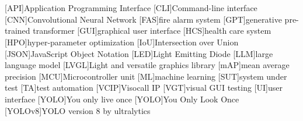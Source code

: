 \documentclass[Bachelor, BIC, english, fhCitStyle, IEEE]{BASE/twbook} %
\begin{document}
\printbibliography
\clearpage

\listoffigures %
\clearpage

\listoftables %
\clearpage

\listoflistings %
\clearpage

{}
\chapter*{\listacroname}
\begin{acronym}
    [API]{Application Programming Interface}
    [CLI]{Command-line interface}
    [CNN]{Convolutional Neural Network}
    [FAS]{fire alarm system}
    [GPT]{generative pre-trained transformer}
    [GUI]{graphical user interface}
    [HCS]{health care system}
    [HPO]{hyper-parameter optimization}
    [IoU]{Intersection over Union}
    [JSON]{JavaScript Object Notation}
    [LED]{Light Emitting Diode}
    [LLM]{large language model}
    [LVGL]{Light and versatile graphics library}
    [mAP]{mean average precision}
    [MCU]{Microcontroller unit}
    [ML]{machine learning}
    [SUT]{system under test}
    [TA]{test automation}
    [VCIP]{Visocall IP}
    [VGT]{visual GUI testing}
    [UI]{user interface}
    [YOLO]{You only live once}
    [YOLO]{You Only Look Once}
    [YOLOv8]{YOLO version 8 by ultralytics}
\end{acronym}
\end{document}
